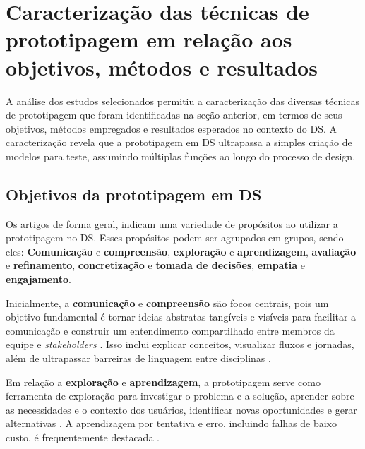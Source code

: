 

\section{Caracterização das técnicas de prototipagem em relação aos objetivos, métodos e resultados}

A análise dos estudos selecionados permitiu a caracterização das diversas técnicas de prototipagem que foram identificadas na seção anterior, em termos de seus objetivos, métodos empregados e resultados esperados no contexto do DS. A caracterização revela que a prototipagem em DS ultrapassa a simples criação de modelos para teste, assumindo múltiplas funções ao longo do processo de design.

\subsection{Objetivos da prototipagem em DS}

Os artigos de forma geral, indicam uma variedade de propósitos ao utilizar a prototipagem no DS. Esses propósitos podem ser agrupados em grupos, sendo eles: \textbf{Comunicação} e \textbf{compreensão}, \textbf{exploração} e \textbf{aprendizagem}, \textbf{avaliação} e \textbf{refinamento}, \textbf{concretização} e \textbf{tomada de decisões}, \textbf{empatia} e \textbf{engajamento}.

Inicialmente, a \textbf{comunicação} e \textbf{compreensão} são focos centrais, pois um objetivo fundamental é tornar ideias abstratas tangíveis e visíveis para facilitar a comunicação e construir um entendimento compartilhado entre membros da equipe e \textit{stakeholders} \cite{paust2025integrative, mager2023product, soto2023prototyping, lee2023industry}. Isso inclui explicar conceitos, visualizar fluxos e jornadas, além de ultrapassar barreiras de linguagem entre disciplinas \cite{paust2025integrative, wang2023smartproducts}.

Em relação a \textbf{exploração} e \textbf{aprendizagem}, a prototipagem serve como ferramenta de exploração para investigar o problema e a solução, aprender sobre as necessidades e o contexto dos usuários, identificar novas oportunidades e gerar alternativas \cite{paust2025integrative, mager2023product, soto2023prototyping, you2022applying, dehmel2021weather, lambe2022capabilities}. A aprendizagem por tentativa e erro, incluindo falhas de baixo custo, é frequentemente destacada \cite{paust2025integrative, soto2023prototyping, you2022applying}.

